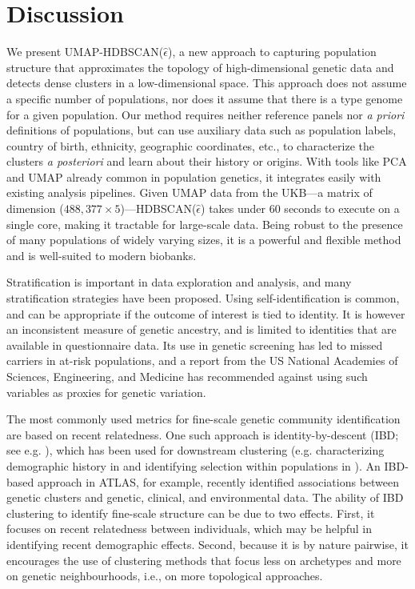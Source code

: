 \section{Discussion}

We present UMAP-HDBSCAN($\hat{\epsilon}$), a new approach to capturing population structure that approximates the topology of high-dimensional genetic data and detects dense clusters in a low-dimensional space. This approach does not assume a specific number of populations, nor does it assume that there is a type genome for a given population. Our method requires neither reference panels nor \emph{a priori} definitions of populations, but can use auxiliary data such as population labels, country of birth, ethnicity, geographic coordinates, etc., to characterize the clusters \emph{a posteriori} and learn about their history or origins. With tools like PCA and UMAP already common in population genetics\citep{diaz-papkovich_review_2021}, it integrates easily with existing analysis pipelines. Given UMAP data from the UKB---a matrix of dimension ($488,377 \times 5$)---HDBSCAN($\hat{\epsilon}$) takes under $60$ seconds to execute on a single core, making it tractable for large-scale data. Being robust to the presence of many populations of widely varying sizes, it is a powerful and flexible method and is well-suited to modern biobanks.

Stratification is important in data exploration and analysis, and many stratification strategies have been proposed. Using self-identification is common, and can be appropriate if the outcome of interest is tied to identity. It is however an inconsistent measure of genetic ancestry, and is limited to identities that are available in questionnaire data. Its use in genetic screening has led to missed carriers in at-risk populations\citep{kaseniit_genetic_2020}, and a report from the US National Academies of Sciences, Engineering, and Medicine has recommended against using such variables as proxies for genetic variation\citep{committee_2023}. 

The most commonly used metrics for fine-scale genetic community identification are based on recent relatedness. One such approach is identity-by-descent (IBD; see e.g. \citep{freyman_fast_2021,shemirani_rapid_2021,qian_efficient_2014,lawson_inference_2012}), which has been used for downstream clustering (e.g. characterizing demographic history in \citep{han_clustering_2017} and identifying selection within populations in \citep{nait_saada_identity-by-descent_2020}). An IBD-based approach in ATLAS, for example, recently identified associations between genetic clusters and genetic, clinical, and environmental data\citep{caggiano_disease_2023}. The ability of IBD clustering to identify fine-scale structure can be due to two effects. First, it focuses on recent relatedness between individuals, which may be helpful in identifying recent demographic effects. Second, because it is by nature pairwise, it encourages the use of clustering methods that focus less on archetypes and more on genetic neighbourhoods, i.e., on more topological approaches.  

